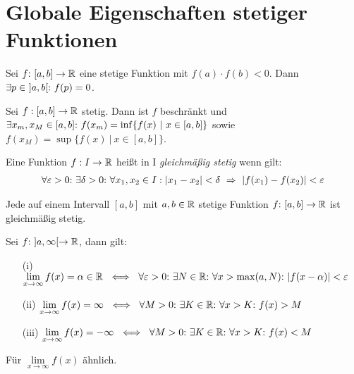\section{Globale Eigenschaften stetiger Funktionen}

\begin{framedthm}
	Sei $f{:}\ [a,b] \to \mathbb{R}$ eine stetige Funktion mit $f(a)\cdot f(b) < 0$. Dann $\exists p \in\  ]a,b[{:}\  f(p)=0$.
\end{framedthm}


\begin{framedthm}
	Sei $f:[a,b] \to \mathbb{R}$ stetig. Dann ist $f$ beschränkt und\\
	$\exists x_m, x_M \in [a,b]{:}\  f(x_m) = \inf\{f(x)\ |\ x \in [a,b]\}$ sowie $f(x_M) = \sup\{f(x)\ |\ x \in [a,b]\}$.
\end{framedthm}


\begin{frameddefn}
	Eine Funktion $f: I \to \mathbb{R}$ heißt in I \textit{gleichmäßig stetig} wenn gilt:
	\begin{align*}
		\forall \varepsilon > 0{:}\  \exists \delta > 0{:}\  \forall x_1, x_2 \in I: |x_1 - x_2| < \delta \ \Rightarrow\ |f(x_1) - f(x_2)| < \varepsilon
	\end{align*}
\end{frameddefn}


\begin{framedthm}
	Jede auf einem Intervall $[a,b]$ mit $a,b \in \mathbb{R}$ stetige Funktion $f{:}\  [a,b] \to \mathbb{R}$ ist gleichmäßig stetig.
\end{framedthm}


\begin{frameddefn}
	Sei $f{:}\ ]a,\infty[\to\mathbb{R}$, dann gilt:
	\begin{enumerate}
		\item[(i)] $\lim\limits_{x \to \infty} f(x) = \alpha \in \R \ \iff\ \forall \varepsilon>0\st \exists N \in \R\st \forall x > \max(a,N)\st |f(x-\alpha)| < \varepsilon$
		\item[(ii)] $\lim\limits_{x \to \infty} f(x) = \infty \ \iff\ \forall M>0\st \exists K \in \R\st \forall x > K\st f(x) > M$
		\item[(iii)] $\lim\limits_{x \to \infty} f(x) = -\infty \ \iff\ \forall M>0\st \exists K \in \R\st \forall x > K\st f(x) < M$
	\end{enumerate}
	Für $\lim\limits_{x \to \infty} f(x)$ ähnlich.
\end{frameddefn}


